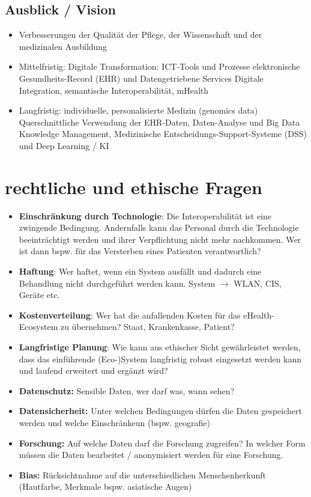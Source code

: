 \documentclass{report}
\theoremstyle{definition}
\theoremstyle{example}
\begin{document}
\section{Ausblick / Vision}
\begin{itemize}
   \item Verbesserungen der Qualität der Pflege, der Wissenschaft und der medizinalen Ausbildung
   \item Mittelfristig:
   \subitem Digitale Transformation: ICT-Tools und Prozesse
   \subitem elektronische Gesundheits-Record (EHR) und Datengetriebene Services
   \subitem Digitale Integration, semantische Interoperabilität, mHealth
   \item Langfristig: 
   \subitem individuelle, personalisierte Medizin (genomics data)
   \subitem Querschnittliche Verwendung der EHR-Daten, Daten-Analyse und Big Data
   \subitem Knowledge Management, Medizinische Entscheidungs-Support-Systeme (DSS) und Deep Learning / KI 
\end{itemize}

\chapter{rechtliche und ethische Fragen}

\begin{itemize}
   \item \textbf{Einschränkung durch Technologie}: Die Interoperabilität ist eine zwingende Bedingung. Andernfalls kann das Personal durch die Technologie beeinträchtigt werden und ihrer Verpflichtung nicht mehr nachkommen. Wer ist dann bspw. für das Versterben eines Patienten verantwortlich?
   \item \textbf{Haftung}: Wer haftet, wenn ein System ausfällt und dadurch eine Behandlung nicht durchgeführt werden kann. System $\rightarrow$ WLAN, CIS, Geräte etc.
   \item \textbf{Kostenverteilung}: Wer hat die anfallenden Kosten für das eHealth-Ecosystem zu übernehmen? Staat, Krankenkasse, Patient?
   \item \textbf{Langfristige Planung}: Wie kann aus ethischer Sicht gewährleistet werden, dass das einführende (Eco-)System langfristig robust eingesetzt werden kann und laufend erweitert und ergänzt wird? 
   \item \textbf{Datenschutz:} Sensible Daten, wer darf was, wann sehen? 
   \item \textbf{Datensicherheit:} Unter welchen Bedingungen dürfen die Daten gespeichert werden und welche Einschränkeun (bspw. geografie)
   \item \textbf{Forschung:} Auf welche Daten darf die Forschung zugreifen? In welcher Form müssen die Daten bearbeitet / anonymisiert werden für eine Forschung.
   \item \textbf{Bias:} Rücksichtnahme auf die unterschiedlichen Menschenherkunft (Hautfarbe, Merkmale bspw. asiatische Augen)
\end{itemize}
\end{document}

